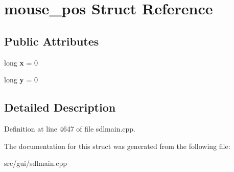 \hypertarget{structmouse__pos}{\section{mouse\-\_\-pos Struct Reference}
\label{structmouse__pos}
}
\subsection*{Public Attributes}
\begin{DoxyCompactItemize}
\item 
\hypertarget{structmouse__pos_a87e6dd58ae6e8c7d1aabb6892b9d6f01}{long {\bfseries x} = 0}\label{structmouse__pos_a87e6dd58ae6e8c7d1aabb6892b9d6f01}

\item 
\hypertarget{structmouse__pos_a5c8305dffdd8ece94010679489de824d}{long {\bfseries y} = 0}\label{structmouse__pos_a5c8305dffdd8ece94010679489de824d}

\end{DoxyCompactItemize}


\subsection{Detailed Description}


Definition at line 4647 of file sdlmain.\-cpp.



The documentation for this struct was generated from the following file\-:\begin{DoxyCompactItemize}
\item 
src/gui/sdlmain.\-cpp\end{DoxyCompactItemize}
